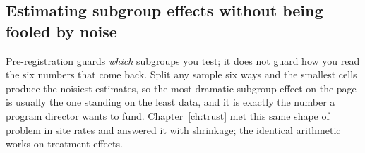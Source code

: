 \subsection{Estimating subgroup effects without being fooled by noise}\label{ch08-sc-shrinkfx}
Pre-registration guards \emph{which} subgroups you test; it does not guard how you read the six numbers that come back. Split any sample six ways and the smallest cells produce the noisiest estimates, so the most dramatic subgroup effect on the page is usually the one standing on the least data, and it is exactly the number a program director wants to fund. Chapter~\ref{ch:trust} met this same shape of problem in site rates and answered it with shrinkage; the identical arithmetic works on treatment effects.

